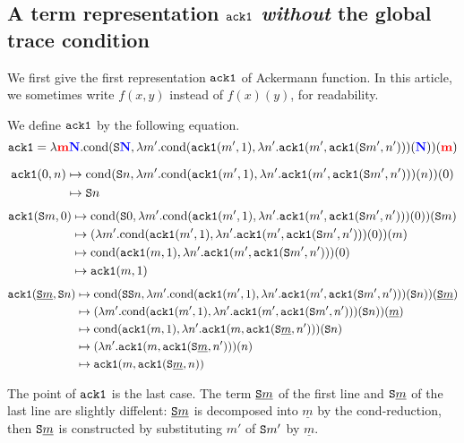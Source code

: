 \subsection{A term representation $\AckA$ \emph{without} the global trace condition}

We first give the first representation $\AckA$ of Ackermann function. 
In this article, we sometimes write $f(x,y)$ instead of $f(x)(y)$, for readability.

\begin{definition}[$\AckA$]\redM
  We define $\AckA$ by the following equation.
  \[
  {\tt ack1} = \lambda {{\bf \color{red}{m}}}{{\bf \color{blue}{N}}}.\text{cond}({\tt S}{{\bf \color{blue}{N}}},\lambda m'.\text{cond}({\tt ack1}(m',1),\lambda n'.{\tt ack1}(m',{\tt ack1}({\tt S}m',n')))({{\bf \color{blue}{N}}}))({{\bf \color{red}{m}}})
  \]
\end{definition}

\begin{align*}
  {\tt ack1}(0,n)
  &\mapsto
  \text{cond}({\tt S}n,\lambda m'.\text{cond}({\tt ack1}(m',1),\lambda n'.{\tt ack1}(m',{\tt ack1}({\tt S}m',n')))(n))(0)
  \\
  &\mapsto
  {\tt S}n
\end{align*}
\begin{align*}
  {\tt ack1}({\tt S}m,0)
  &\mapsto
  \text{cond}({\tt S}0,\lambda m'.\text{cond}({\tt ack1}(m',1),\lambda n'.{\tt ack1}(m',{\tt ack1}({\tt S}m',n')))(0))({\tt S}m)
  \\
  &\mapsto
  (\lambda m'.\text{cond}({\tt ack1}(m',1),\lambda n'.{\tt ack1}(m',{\tt ack1}({\tt S}m',n')))(0))(m)
  \\
  &\mapsto
  \text{cond}({\tt ack1}(m,1),\lambda n'.{\tt ack1}(m',{\tt ack1}({\tt S}m',n')))(0)
  \\
  &\mapsto
  {\tt ack1}(m,1)
\end{align*}
\begin{align*}
  {\tt ack1}(\underline{{\tt S}m},{\tt S}n)
  &\mapsto
  \text{cond}({\tt S}{\tt S}n,\lambda m'.\text{cond}({\tt ack1}(m',1),\lambda n'.{\tt ack1}(m',{\tt ack1}({\tt S}m',n')))({\tt S}n))(\underline{{\tt S}m})
  \\
  &\mapsto
  (\lambda m'.\text{cond}({\tt ack1}(m',1),\lambda n'.{\tt ack1}(m',{\tt ack1}({\tt S}m',n')))({\tt S}n))(\underline{m})
  \\
  &\mapsto
  \text{cond}({\tt ack1}(m,1),\lambda n'.{\tt ack1}(m,{\tt ack1}({\tt S}\underline{m},n')))({\tt S}n)
  \\
  &\mapsto
  (\lambda n'.{\tt ack1}(m,{\tt ack1}({\tt S}\underline{m},n')))(n)
  \\
  &\mapsto
  {\tt ack1}(m,{\tt ack1}({\tt S}\underline{m},n))
\end{align*}

The point of $\AckA$ is the last case. The term $\underline{{\tt S}m}$ of the first line and ${\tt S}\underline{m}$ of the last line are slightly diffelent: $\underline{{\tt S}m}$ is decomposed into $\underline{m}$ by the $\text{cond}$-reduction, then ${\tt S}\underline{m}$ is constructed by substituting $m'$ of ${\tt S}m'$ by $\underline{m}$. 



